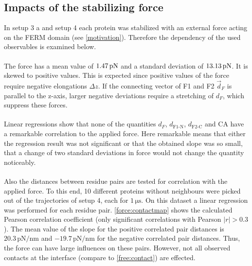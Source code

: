 \subsection{Impacts of the stabilizing force}
In setup 3 a and setup 4 each protein was stabilized with an external force acting on the FERM domain (see \autoref{motivation}). Therefore the dependency of the used observables is examined below.\\
\\
The force has a mean value of $1.47\,\forceunit$ and a standard deviation of $13.13\,\forceunit$. It is skewed to positive values. This is expected since positive values of the force require negative elongations $\Delta z$. If the connecting vector of F1 and F2 $\vec{d}_F$ is parallel to the z-axis, larger negative deviations require a stretching of $d_F$, which suppress these forces. \\
\\
Linear regressions show that none of the quantities $d_F$, $d_\text{F1-N}$, $d_\text{F2-C}$ and CA have a remarkable correlation to the applied force. Here remarkable means that either the regression result was not significant or that the obtained slope was so small, that a change of two standard deviations in force would not change the quantity noticeably.\\
\\
Also the distances between residue pairs are tested for correlation with the applied force. To this end, 10 different proteins without neighbours were picked out of the trajectories of setup 4, each for $1\,\si{\micro\second}$. On this dataset a linear regression was performed for each residue pair. \autoref{force:contactmap} shows the calculated Pearson correlation coefficient (only significant correlations with Pearson $\left|r\right| > 0.3$). The mean value of the slope for the positive correlated pair distances is $20.3\,\si{\pico\newton/\nano\metre}$ and $-19.7\,\si{\pico\newton/\nano\metre}$ for the negative correlated pair distances. Thus, the force can have large influences on these pairs. However, not all observed contacts at the interface (compare to \autoref{free:contact}) are effected.
%
%
%
